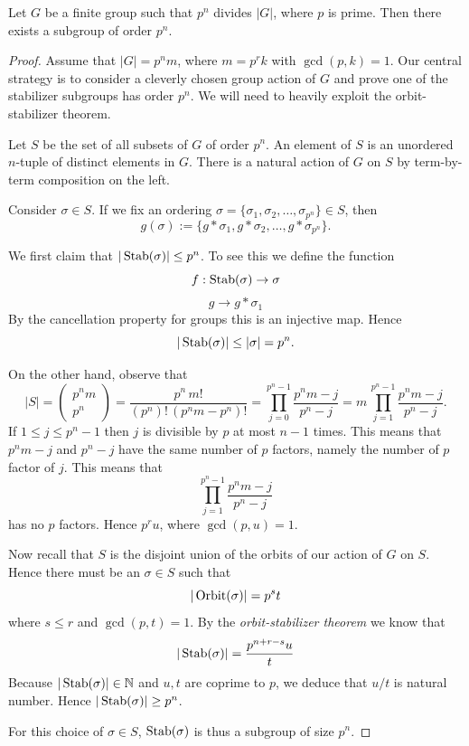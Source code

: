 \begin{theorem}
    Let $G$ be a finite group such that $p^n$ divides $|G|$, where $p$ is prime. Then there exists 
    a subgroup of order $p^n$.
\end{theorem}
\begin{proof}
    Assume that $|G| = p^n m$, where $m = p^rk$ with $\gcd(p, k) = 1$. Our central strategy is to consider 
    a cleverly chosen group action of $G$ and prove one of the stabilizer subgroups has order $p^n$. We will 
    need to heavily exploit the orbit-stabilizer theorem.

    Let $S$ be the set of all subsets of $G$ of order $p^n$. An element of $S$ is an unordered $n$-tuple 
    of distinct elements in $G$. There is a natural action of $G$ on $S$ by term-by-term composition on the left.

    Consider $\sigma \in S$. If we fix an ordering $\sigma = \{ \sigma_1, \sigma_2, \ldots, \sigma_{p^n} \} \in S$, then 
    \[
        g(\sigma) := \{ g * \sigma_1, g * \sigma_2, \ldots, g * \sigma_{p^n} \}.
    \] 

    We first claim that $|\operatorname{Stab}(\sigma)| \leq p^n$. To see this we define the function
    \[
        f : \operatorname{Stab}(\sigma) \to \sigma
    \]
    \[
        g \to g * \sigma_1
    \]
    By the cancellation property for groups this is an injective map. Hence 
    \[
        |\operatorname{Stab}(\sigma)| \leq |\sigma| = p^n.
    \]

    On the other hand, observe that 
    \[
        |S| = \begin{pmatrix}
            p^nm \\ p^n 
        \end{pmatrix} = \frac{p^n \, m!}{(p^n)!\, (p^nm - p^n)!}
        = \prod^{p^n - 1}_{j=0} \frac{p^nm - j}{p^n - j}
        = m\, \prod^{p^n - 1}_{j=1} \frac{p^nm - j}{p^n - j}.
    \]
    If $1 \leq j \leq p^n - 1$ then $j$ is divisible by $p$ at most $n-1$ times. This means 
    that $p^nm - j$ and $p^n - j$ have the same number of $p$ factors, namely the number of $p$ factor 
    of $j$. This means that 
    \[
        \prod^{p^n - 1}_{j=1} \frac{p^nm - j}{p^n - j}
    \]
    has no $p$ factors. Hence $p^r u$, where $\gcd(p, u) = 1$.

    Now recall that $S$ is the disjoint union of the orbits of our action of 
    $G$ on $S$. Hence there must be an $\sigma \in S$ such that 
    \[
        |\operatorname{Orbit}(\sigma)| = p^s t 
    \]
    where $s \leq r$ and $\gcd(p, t) = 1$. By the \textit{orbit-stabilizer theorem} we 
    know that 
    \[
        |\operatorname{Stab}(\sigma)| = \frac{p^{n+r-s} u}{t}
    \]
    Because $|\operatorname{Stab}(\sigma)| \in \mathbb{N}$ and $u,t$ are coprime to $p$, 
    we deduce that $u/t$ is natural number. Hence $|\operatorname{Stab}(\sigma)| \geq p^n$.

    For this choice of $\sigma \in S$, $\operatorname{Stab}(\sigma)$ is thus a subgroup of size $p^n$.
\end{proof}

